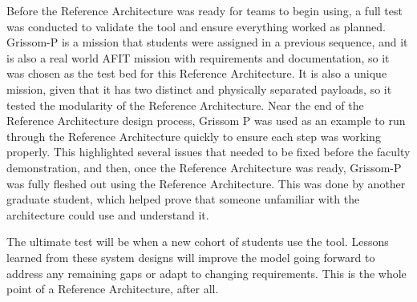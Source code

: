 Before the Reference Architecture was ready for teams to begin using, a full test was conducted to validate the tool and ensure everything worked as planned. Grissom-P is a mission that students were assigned in a previous sequence, and it is also a real world AFIT mission with requirements and documentation, so it was chosen as the test bed for this Reference Architecture. It is also a unique mission, given that it has two distinct and physically separated payloads, so it tested the modularity of the Reference Architecture. Near the end of the Reference Architecture design process, Grissom P was used as an example to run through the Reference Architecture quickly to ensure each step was working properly. This highlighted several issues that needed to be fixed before the faculty demonstration, and then, once the Reference Architecture was ready, Grissom-P was fully fleshed out using the Reference Architecture. This was done by another graduate student, which helped prove that someone unfamiliar with the architecture could use and understand it. 

The ultimate test will be when a new cohort of students use the tool. Lessons learned from these system designs will improve the model going forward to address any remaining gaps or adapt to changing requirements. This is the whole point of a Reference Architecture, after all.